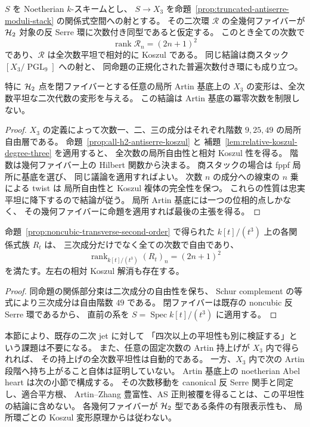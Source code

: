 \begin{corollary}
\label{cor:h2-geometric-family-koszul}
$S$ を Noetherian $k$-スキームとし、
$S\to X_3$ を命題~\ref{prop:truncated-antiserre-moduli-stack}
の関係式空間への射とする。
その二次環 $\mathcal R$ の全幾何ファイバーが
$\mathcal H_2$ 対象の反 Serre 環に次数付き同型であると仮定する。
このとき全ての次数で
\[
 \operatorname{rank}\mathcal R_n=(2n+1)^2
\]
であり、$\mathcal R$ は全次数平坦で相対的に Koszul である。
同じ結論は商スタック $[X_3/\operatorname{PGL}_9]$ への射と、
同命題の正規化された普遍次数付き環にも成り立つ。

特に $\mathcal H_2$ 点を閉ファイバーとする任意の局所 Artin 基底上の
$X_3$ の変形は、全次数平坦な二次代数の変形を与える。
この結論は Artin 基底の冪零次数を制限しない。
\end{corollary}
\begin{proof}
$X_3$ の定義によって次数一、二、三の成分はそれぞれ階数
$9,25,49$ の局所自由層である。
命題~\ref{prop:all-h2-antiserre-koszul} と
補題~\ref{lem:relative-koszul-degree-three} を適用すると、
全次数の局所自由性と相対 Koszul 性を得る。
階数は幾何ファイバー上の Hilbert 関数から決まる。
商スタックの場合は fppf 局所に基底を選び、
同じ議論を適用すればよい。
次数 $n$ の成分への線束の $n$ 乗による twist は
局所自由性と Koszul 複体の完全性を保つ。
これらの性質は忠実平坦に降下するので結論が従う。
局所 Artin 基底には一つの位相的点しかなく、
その幾何ファイバーに命題を適用すれば最後の主張を得る。
\end{proof}

\begin{corollary}
\label{cor:noncubic-second-order-all-degrees}
命題~\ref{prop:noncubic-transverse-second-order} で得られた
$k[t]/(t^3)$ 上の各関係式族 $R_t$ は、
三次成分だけでなく全ての次数で自由であり、
\[
 \operatorname{rank}_{k[t]/(t^3)}(R_t)_n=(2n+1)^2
\]
を満たす。左右の相対 Koszul 解消も存在する。
\end{corollary}
\begin{proof}
同命題の関係部分束は二次成分の自由性を保ち、
Schur complement の等式により三次成分は自由階数 $49$ である。
閉ファイバーは既存の noncubic 反 Serre 環であるから、
直前の系を $S=\operatorname{Spec}k[t]/(t^3)$ に適用する。
\end{proof}

\begin{remark}[全次数平坦性と内在的相対モジュライの区別]
本節により、既存の二次 jet に対して
「四次以上の平坦性も別に検証する」という課題は不要になる。
また、任意の固定次数の Artin 持上げが $X_3$ 内で得られれば、
その持上げの全次数平坦性は自動的である。
一方、$X_3$ 内で次の Artin 段階へ持ち上がること自体は証明していない。
Artin 基底上の noetherian Abel heart は次の小節で構成する。
その次数移動を canonical 反 Serre 関手と同定し、適合平方根、
Artin--Zhang 豊富性、AS 正則被覆を得ることは、この平坦性の結論に含めない。
各幾何ファイバーが $\mathcal H_2$ 型である条件の有限表示性も、
局所環ごとの Koszul 変形原理からは従わない。
\end{remark}

